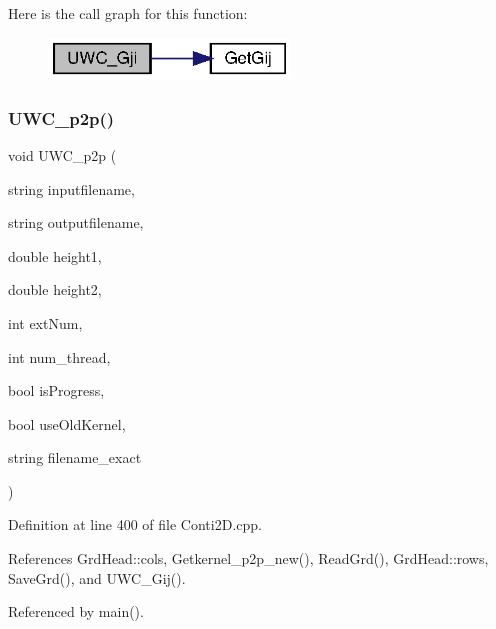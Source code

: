 Here is the call graph for this function\+:
\nopagebreak
\begin{figure}[H]
\begin{center}
\leavevmode
\includegraphics[width=182pt]{Conti2D_8cpp_a7ab8990653bc3bdbef25f3b17e949f0f_a7ab8990653bc3bdbef25f3b17e949f0f_cgraph}
\end{center}
\end{figure}
\mbox{\label{Conti2D_8cpp_a7b6bfe9f5b32bc1a62005196d84edfde_a7b6bfe9f5b32bc1a62005196d84edfde}} 
\subsubsection{U\+W\+C\+\_\+p2p()}
{\footnotesize\ttfamily void U\+W\+C\+\_\+p2p (\begin{DoxyParamCaption}\item[{string}]{inputfilename,  }\item[{string}]{outputfilename,  }\item[{double}]{height1,  }\item[{double}]{height2,  }\item[{int}]{ext\+Num,  }\item[{int}]{num\+\_\+thread,  }\item[{bool}]{is\+Progress,  }\item[{bool}]{use\+Old\+Kernel,  }\item[{string}]{filename\+\_\+exact }\end{DoxyParamCaption})}



Definition at line 400 of file Conti2\+D.\+cpp.



References Grd\+Head\+::cols, Getkernel\+\_\+p2p\+\_\+new(), Read\+Grd(), Grd\+Head\+::rows, Save\+Grd(), and U\+W\+C\+\_\+\+Gij().



Referenced by main().

